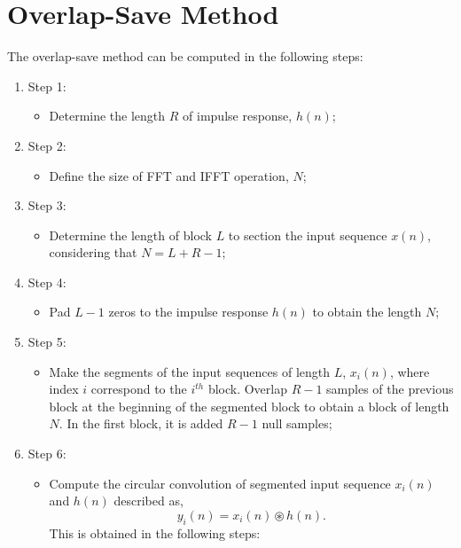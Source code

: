 \documentclass[a4paper]{article}
\begin{document}
\section{Overlap-Save Method}
The overlap-save method can be computed in the following steps:
\begin{enumerate}
    \item   Step 1:
    \begin{itemize}
        \item   Determine the length $R$ of impulse response, $h(n)$;
    \end{itemize}
    \item   Step 2:
    \begin{itemize}
        \item   Define the size of FFT and IFFT operation, $N$;
    \end{itemize}
    \item   Step 3:
    \begin{itemize}
        \item   Determine the length of block $L$ to section the input sequence $x(n)$, considering that $N=L+R-1$;
    \end{itemize}
    \item   Step 4:
    \begin{itemize}
        \item   Pad $L-1$ zeros to the impulse response $h(n)$ to obtain the length $N$;
    \end{itemize}
    \item   Step 5:
    \begin{itemize}
        \item   Make the segments of the input sequences of length $L$, $x_i(n)$, where index $i$ correspond to the $i^{th}$ block. Overlap $R-1$ samples of the previous block at the beginning of the segmented block to obtain a block of length $N$. In the first block, it is added $R-1$ null samples;
    \end{itemize}
    \item   Step 6:
    \begin{itemize}
        \item   Compute the circular convolution of segmented input sequence $x_i(n)$ and $h(n)$ described as,
        \begin{equation}
            y_i(n)= x_i(n) \circledast h(n).
            \label{genFIR}
        \end{equation}
        This is obtained in the following steps:
        \begin{itemize}

\end{itemize}
\end{itemize}
\end{enumerate}
\end{document}
